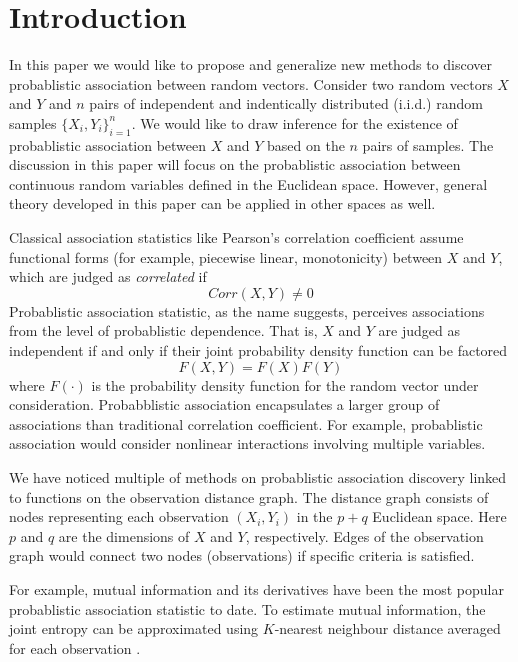 \documentclass{sig-alternate}
\begin{document}


\section{Introduction}
\label{sec:intro}

In this paper we would like to propose and generalize new methods to
discover probablistic association between random vectors. Consider two
random vectors $X$ and $Y$ and $n$ pairs of independent and
indentically distributed (i.i.d.) random samples $\{X_i,
Y_i\}_{i=1}^n$. We would like to draw inference for the existence of
probablistic association between $X$ and $Y$ based on the $n$ pairs of
samples. The discussion in this paper will focus on the probablistic
association between continuous random variables defined in the
Euclidean space. However, general theory developed in this paper can
be applied in other spaces as well.

Classical association statistics like Pearson's correlation
coefficient assume functional forms (for example, piecewise linear,
monotonicity) between $X$ and $Y$, which are judged as
\emph{correlated} if
\begin{displaymath}
  Corr(X,Y) \ne 0
\end{displaymath}
Probablistic association statistic, as the name suggests, perceives
associations from the level of probablistic dependence. That is, $X$
and $Y$ are judged as independent if and only if their joint
probability density function can be factored
\begin{equation}
  \label{eq:independence}
  F(X,Y)= F(X) F(Y)
\end{equation}
where $F(\cdot)$ is the probability density function for the random
vector under consideration. Probabblistic association encapsulates a
larger group of associations than traditional correlation coefficient.
For example, probablistic association would consider nonlinear
interactions involving multiple variables.

We have noticed multiple of methods on probablistic association
discovery linked to functions on the observation distance graph. The
distance graph consists of nodes representing each observation $(X_i,
Y_i)$ in the $p+q$ Euclidean space. Here $p$ and $q$ are the
dimensions of $X$ and $Y$, respectively. Edges of the observation
graph would connect two nodes (observations) if specific criteria is
satisfied.

For example, mutual information and its derivatives have been the most
popular probablistic association statistic to
date\cite{cite:my-cas-work, citation:MINE-science,
  tostevin2009mutual}. To estimate mutual information, the joint
entropy can be approximated using $K$-nearest neighbour distance
averaged for each observation \cite{PhysRevE.69.066138, leonenko2008,
  doi:10.1080/104852504200026815}.
\end{document}
